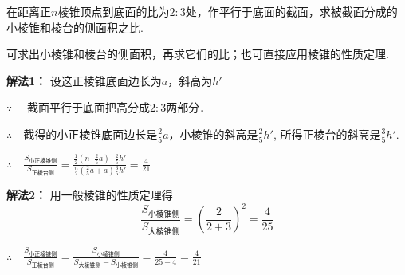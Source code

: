\noindent
\begin{minipage}{.55\textwidth}
\begin{example}
    在距离正$n$棱锥顶点到底面的比为$2:3$处，作平行于底面的截面，求被截面分成的小棱锥和棱台的侧面积之比.
\end{example}

\begin{analyze}
可求出小棱锥和棱台的侧面积，再求它们的比；也可直接应用棱锥的性质定理.
\end{analyze}
\end{minipage}
\hfill
\begin{minipage}{.43\textwidth}
\centering
{}
\end{minipage}


\textbf{解法1：} 设这正棱锥底面边长为$a$，斜高为$h'$

$\because\quad$ 截面平行于底面把高分成$2:3$两部分．

$\therefore\quad$截得的小正棱锥底面边长是$\frac{2}{5}a$，小棱锥的斜高是$\frac{2}{5}h'$, 所得正棱台的斜高是$\frac{3}{5}h'$.

$\therefore\quad \frac{S_{\text{小正棱锥侧}}}{S_{\text{正棱台侧}}}=\frac{\frac{1}{2}\left(n\cdot \frac{2}{5}a\right)\cdot \frac{2}{5}h'}{\frac{n}{2}\left(\frac{2}{5}a+a\right)\frac{3}{5}h'}=\frac{4}{21}$

\textbf{解法2：} 用一般棱锥的性质定理得
\[\frac{S_{\text{小棱锥侧}}}{S_{\text{大棱锥侧}}}=\left(\frac{2}{2+3}\right)^2=\frac{4}{25}\]

$\therefore\quad \frac{S_{\text{小正棱锥侧}}}{S_{\text{正棱台侧}}}=\frac{S_{\text{小棱锥侧}}}{S_{\text{大棱锥侧}}-S_{\text{小棱锥侧}}}=\frac{4}{25-4}=\frac{4}{21}$




